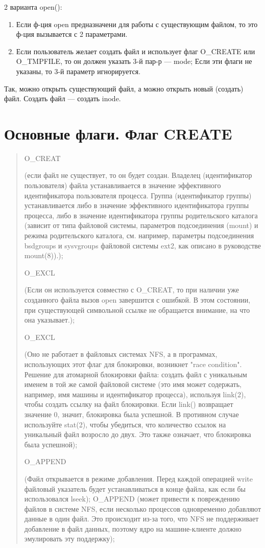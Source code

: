 2 варианта open():
\begin{enumerate}
    \item Если ф-ция open предназначени для работы с существующим файлом, то это ф-ция вызывается с 2 параметрами.
    \item Если пользователь желает создать файл и использует флаг O\_CREATE или O\_TMPFILE, то он должен указать 3-й пар-р --- mode; Если эти флаги не указаны, то 3-й параметр игнорируется.
\end{enumerate}

Так, можно открыть существующий файл, а можно открыть новый (создать) файл. Создать файл --- создать inode.


\section{Основные флаги. Флаг CREATE}

\begin{quote}

O\_CREAT

(если файл не существует, то он будет создан. Владелец (идентификатор пользователя) файла устанавливается в значение эффективного идентификатора пользователя процесса. Группа (идентификатор группы) устанавливается либо в значение эффективного идентификатора группы процесса, либо в значение идентификатора группы родительского каталога (зависит от типа файловой системы, параметров подсоединения (mount) и режима родительского каталога, см. например, параметры подсоединения bsdgroups и sysvgroups файловой системы ext2, как описано в руководстве mount(8)).);

O\_EXCL

(Если он используется совместно с O\_CREAT, то при наличии уже созданного файла вызов open завершится с ошибкой. В этом состоянии, при существующей символьной ссылке не обращается внимание, на что она указывает.);

O\_EXCL

(Оно не работает в файловых системах NFS, а в программах, использующих этот флаг для блокировки, возникнет "race condition". Решение для атомарной блокировки файла: создать файл с уникальным именем в той же самой файловой системе (это имя может содержать, например, имя машины и идентификатор процесса), используя link(2), чтобы создать ссылку на файл блокировки. Если link() возвращает значение 0, значит, блокировка была успешной. В противном случае используйте stat(2), чтобы убедиться, что количество ссылок на уникальный файл возросло до двух. Это также означает, что блокировка была успешной);

O\_APPEND

(Файл открывается в режиме добавления. Перед каждой операцией write файловый указатель будет устанавливаться в конце файла, как если бы использовался lseek); O\_APPEND (может привести к повреждению файлов в системе NFS, если несколько процессов одновременно добавляют данные в один файл. Это происходит из-за того, что NFS не поддерживает добавление в файл данных, поэтому ядро на машине-клиенте должно эмулировать эту поддержку);

\end{quote}

